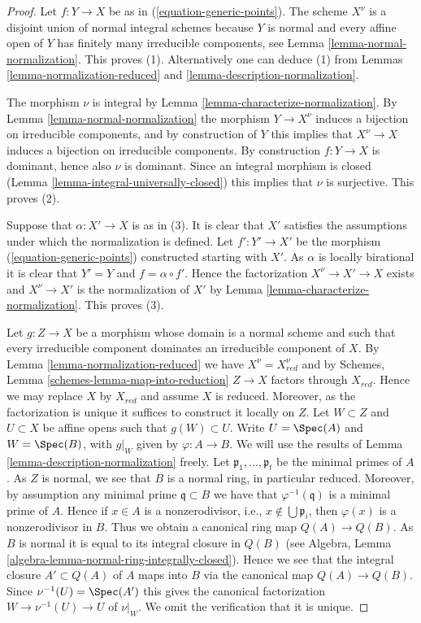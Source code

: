 \begin{proof}
Let $f : Y \to X$ be as in (\ref{equation-generic-points}).
The scheme $X^\nu$ is a disjoint union of normal integral schemes
because $Y$ is normal and every affine open of $Y$ has finitely
many irreducible components, see
Lemma \ref{lemma-normal-normalization}. This proves (1).
Alternatively one can deduce (1) from
Lemmas \ref{lemma-normalization-reduced} and
\ref{lemma-description-normalization}.

\medskip\noindent
The morphism $\nu$ is integral by Lemma \ref{lemma-characterize-normalization}.
By Lemma \ref{lemma-normal-normalization} the
morphism $Y \to X^\nu$ induces a bijection on irreducible components,
and by construction of $Y$ this implies that $X^\nu \to X$ induces
a bijection on irreducible components. By construction $f : Y \to X$
is dominant, hence also $\nu$ is dominant. Since an integral morphism is
closed (Lemma \ref{lemma-integral-universally-closed}) this implies that
$\nu$ is surjective. This proves (2).

\medskip\noindent
Suppose that $\alpha : X' \to X$ is as in (3). It is clear that
$X'$ satisfies the assumptions under which the normalization
is defined. Let $f' : Y' \to X'$ be the morphism
(\ref{equation-generic-points}) constructed starting with $X'$.
As $\alpha$ is locally birational it is clear that
$Y' = Y$ and $f = \alpha \circ f'$.
Hence the factorization $X^\nu \to X' \to X$ exists
and $X^\nu \to X'$ is the normalization of $X'$ by
Lemma \ref{lemma-characterize-normalization}. This proves (3).

\medskip\noindent
Let $g : Z \to X$ be a morphism whose domain is a normal scheme
and such that every irreducible component dominates an irreducible
component of $X$. By Lemma \ref{lemma-normalization-reduced}
we have $X^\nu = X_{red}^\nu$ and by
Schemes, Lemma \ref{schemes-lemma-map-into-reduction}
$Z \to X$ factors through $X_{red}$. Hence we may replace $X$ by
$X_{red}$ and assume $X$ is reduced. Moreover, as the factorization
is unique it suffices to construct it locally on $Z$.
Let $W \subset Z$ and $U \subset X$ be affine opens
such that $g(W) \subset U$. Write $U = \Spec(A)$ and
$W = \Spec(B)$, with $g|_W$ given by $\varphi : A \to B$.
We will use the results of Lemma \ref{lemma-description-normalization} freely.
Let $\mathfrak p_1, \ldots, \mathfrak p_t$ be the minimal primes of $A$.
As $Z$ is normal, we see that $B$ is a normal
ring, in particular reduced. Moreover, by assumption any minimal
prime $\mathfrak q \subset B$ we have that $\varphi^{-1}(\mathfrak q)$
is a minimal prime of $A$. Hence if $x \in A$ is a nonzerodivisor, i.e.,
$x \not \in \bigcup \mathfrak p_i$, then $\varphi(x)$ is a nonzerodivisor
in $B$. Thus we obtain a canonical ring map $Q(A) \to Q(B)$. As $B$ is
normal it is equal to its integral closure in $Q(B)$ (see
Algebra, Lemma \ref{algebra-lemma-normal-ring-integrally-closed}).
Hence we see that the integral closure $A' \subset Q(A)$ of $A$
maps into $B$ via the canonical map $Q(A) \to Q(B)$.
Since $\nu^{-1}(U) = \Spec(A')$ this gives the canonical
factorization $W \to \nu^{-1}(U) \to U$ of $\nu|_W$.
We omit the verification that it is unique.
\end{proof}

